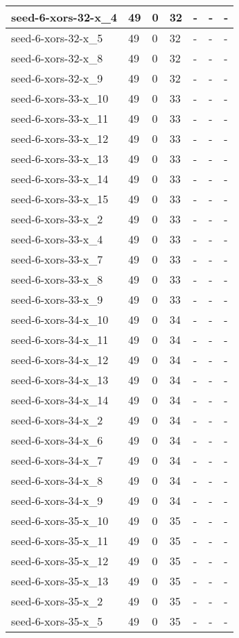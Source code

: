 \begin{scriptsize}
\begin{longtable}{|p{5cm}|l|l|l|l|l|l|}
seed-6-xors-32-x\_4&49&0&32&-&-&- \\ \hline 
seed-6-xors-32-x\_5&49&0&32&-&-&- \\ \hline 
seed-6-xors-32-x\_8&49&0&32&-&-&- \\ \hline 
seed-6-xors-32-x\_9&49&0&32&-&-&- \\ \hline 
seed-6-xors-33-x\_10&49&0&33&-&-&- \\ \hline 
seed-6-xors-33-x\_11&49&0&33&-&-&- \\ \hline 
seed-6-xors-33-x\_12&49&0&33&-&-&- \\ \hline 
seed-6-xors-33-x\_13&49&0&33&-&-&- \\ \hline 
seed-6-xors-33-x\_14&49&0&33&-&-&- \\ \hline 
seed-6-xors-33-x\_15&49&0&33&-&-&- \\ \hline 
seed-6-xors-33-x\_2&49&0&33&-&-&- \\ \hline 
seed-6-xors-33-x\_4&49&0&33&-&-&- \\ \hline 
seed-6-xors-33-x\_7&49&0&33&-&-&- \\ \hline 
seed-6-xors-33-x\_8&49&0&33&-&-&- \\ \hline 
seed-6-xors-33-x\_9&49&0&33&-&-&- \\ \hline 
seed-6-xors-34-x\_10&49&0&34&-&-&- \\ \hline 
seed-6-xors-34-x\_11&49&0&34&-&-&- \\ \hline 
seed-6-xors-34-x\_12&49&0&34&-&-&- \\ \hline 
seed-6-xors-34-x\_13&49&0&34&-&-&- \\ \hline 
seed-6-xors-34-x\_14&49&0&34&-&-&- \\ \hline 
seed-6-xors-34-x\_2&49&0&34&-&-&- \\ \hline 
seed-6-xors-34-x\_6&49&0&34&-&-&- \\ \hline 
seed-6-xors-34-x\_7&49&0&34&-&-&- \\ \hline 
seed-6-xors-34-x\_8&49&0&34&-&-&- \\ \hline 
seed-6-xors-34-x\_9&49&0&34&-&-&- \\ \hline 
seed-6-xors-35-x\_10&49&0&35&-&-&- \\ \hline 
seed-6-xors-35-x\_11&49&0&35&-&-&- \\ \hline 
seed-6-xors-35-x\_12&49&0&35&-&-&- \\ \hline 
seed-6-xors-35-x\_13&49&0&35&-&-&- \\ \hline 
seed-6-xors-35-x\_2&49&0&35&-&-&- \\ \hline 
seed-6-xors-35-x\_5&49&0&35&-&-&- \\ \hline 

\end{longtable}
\end{scriptsize}
